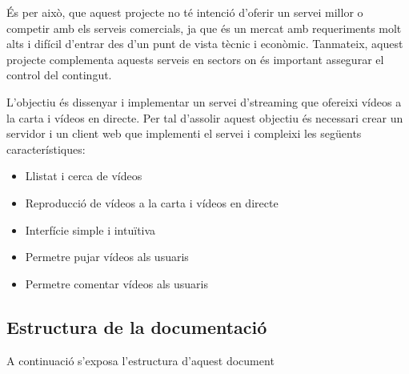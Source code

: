 \documentclass[12pt, titlepage]{article}
\begin{document}
És per això, que aquest projecte no té intenció d'oferir un servei millor o competir
amb els serveis comercials, ja que és un mercat amb requeriments molt alts i difícil
d'entrar des d'un punt de vista tècnic i econòmic. Tanmateix, aquest projecte
complementa aquests serveis en sectors on és important assegurar el control del
contingut.

L'objectiu és dissenyar i implementar un servei d’streaming que ofereixi vídeos
a la carta i vídeos en directe. Per tal d'assolir aquest objectiu és necessari
crear un servidor i un client web que implementi el servei i compleixi les següents
característiques:

\begin{itemize}
\item Llistat i cerca de vídeos
\item Reproducció de vídeos a la carta i vídeos en directe
\item Interfície simple i intuïtiva
\item Permetre pujar vídeos als usuaris
\item Permetre comentar vídeos als usuaris
\end{itemize}

\subsection{Estructura de la documentació}

A continuació s'exposa l'estructura d'aquest document
\end{document}
